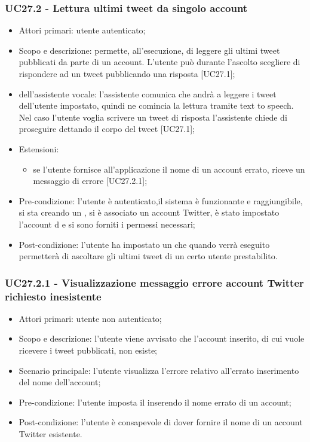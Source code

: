 \subsubsection{UC27.2 - Lettura ultimi tweet da singolo account}
\begin{itemize}
	\item  Attori primari: utente autenticato;
	\item  Scopo e descrizione: permette, all'esecuzione, di leggere gli ultimi tweet pubblicati da parte di un account. L'utente può durante l'ascolto scegliere di rispondere ad un tweet pubblicando una risposta [UC27.1];
	\item  {} dell'assistente vocale: l'assistente comunica che andrà a leggere i tweet dell'utente impostato, quindi ne comincia la lettura tramite text to speech. Nel caso l'utente voglia scrivere un tweet di risposta l'assistente chiede di proseguire dettando il corpo del tweet [UC27.1];
	\item  Estensioni: 
		   \begin{itemize}
				\item se l'utente fornisce all'applicazione il nome di un account errato, riceve un messaggio di errore [UC27.2.1];
		   \end{itemize}
	\item  Pre-condizione: l'utente è autenticato,il sistema è funzionante e raggiungibile, si sta creando un , si è associato un account Twitter, è stato impostato l'account d e si sono forniti i permessi necessari;
	\item  Post-condizione: l'utente ha impostato un  che quando verrà eseguito permetterà di ascoltare gli ultimi tweet di un certo utente prestabilito.
\end{itemize}
\subsubsection{UC27.2.1 - Visualizzazione messaggio errore account Twitter richiesto inesistente}
\begin{itemize}
	\item  Attori primari: utente non autenticato;
	\item  Scopo e descrizione: l'utente viene avvisato che l'account inserito, di cui vuole ricevere i tweet pubblicati, non esiste;
	\item  Scenario principale: l'utente visualizza l'errore relativo all'errato inserimento del nome dell'account;
	\item  Pre-condizione: l'utente imposta il  inserendo il nome errato di un account;
	\item  Post-condizione: l'utente è consapevole di dover fornire il nome di un account Twitter esistente.
\end{itemize}
